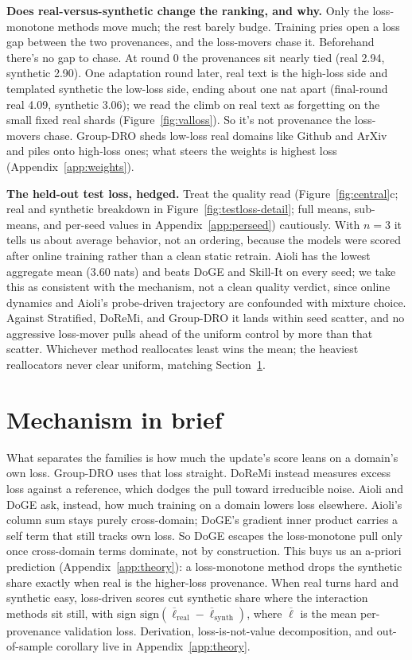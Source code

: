 \documentclass{article}
\begin{document}
\textbf{Does real-versus-synthetic change the ranking, and why.} Only the loss-monotone methods move much; the rest barely budge. Training pries open a loss gap between the two provenances, and the loss-movers chase it. Beforehand there's no gap to chase. At round 0 the provenances sit nearly tied (real 2.94, synthetic 2.90). One adaptation round later, real text is the high-loss side and templated synthetic the low-loss side, ending about one nat apart (final-round real 4.09, synthetic 3.06); we read the climb on real text as forgetting on the small fixed real shards (Figure~\ref{fig:valloss}). So it's not provenance the loss-movers chase. Group-DRO sheds low-loss real domains like Github and ArXiv and piles onto high-loss ones; what steers the weights is highest loss (Appendix~\ref{app:weights}).

\textbf{The held-out test loss, hedged.} Treat the quality read (Figure~\ref{fig:central}c; real and synthetic breakdown in Figure~\ref{fig:testloss-detail}; full means, sub-means, and per-seed values in Appendix~\ref{app:perseed}) cautiously. With $n=3$ it tells us about average behavior, not an ordering, because the models were scored after online training rather than a clean static retrain. Aioli has the lowest aggregate mean (3.60 nats) and beats DoGE and Skill-It on every seed; we take this as consistent with the mechanism, not a clean quality verdict, since online dynamics and Aioli's probe-driven trajectory are confounded with mixture choice. Against Stratified, DoReMi, and Group-DRO it lands within seed scatter, and no aggressive loss-mover pulls ahead of the uniform control by more than that scatter. Whichever method reallocates least wins the mean; the heaviest reallocators never clear uniform, matching Section~\ref{sec:mech}.

\section{Mechanism in brief}
\label{sec:mech}

What separates the families is how much the update's score leans on a domain's own loss. Group-DRO uses that loss straight. DoReMi instead measures excess loss against a reference, which dodges the pull toward irreducible noise. Aioli and DoGE ask, instead, how much training on a domain lowers loss elsewhere. Aioli's column sum stays purely cross-domain; DoGE's gradient inner product carries a self term that still tracks own loss. So DoGE escapes the loss-monotone pull only once cross-domain terms dominate, not by construction. This buys us an a-priori prediction (Appendix~\ref{app:theory}): a loss-monotone method drops the synthetic share exactly when real is the higher-loss provenance. When real turns hard and synthetic easy, loss-driven scores cut synthetic share where the interaction methods sit still, with sign $\mathrm{sign}(\overline{\ell}_{\mathrm{real}}-\overline{\ell}_{\mathrm{synth}})$, where $\overline{\ell}$ is the mean per-provenance validation loss. Derivation, loss-is-not-value decomposition, and out-of-sample corollary live in Appendix~\ref{app:theory}.
\end{document}
